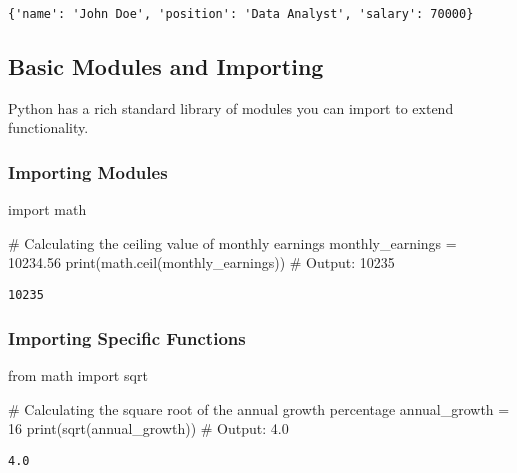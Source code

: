\documentclass[
  letterpaper,
  DIV=11,
  numbers=noendperiod]{scrreprt}
\newenvironment{Shaded}{\begin{snugshade}}{\end{snugshade}}
\newcommand{\BuiltInTok}[1]{\textcolor[rgb]{0.00,0.23,0.31}{#1}}
\newcommand{\CommentTok}[1]{\textcolor[rgb]{0.37,0.37,0.37}{#1}}
\newcommand{\DecValTok}[1]{\textcolor[rgb]{0.68,0.00,0.00}{#1}}
\newcommand{\FloatTok}[1]{\textcolor[rgb]{0.68,0.00,0.00}{#1}}
\newcommand{\ImportTok}[1]{\textcolor[rgb]{0.00,0.46,0.62}{#1}}
\newcommand{\NormalTok}[1]{\textcolor[rgb]{0.00,0.23,0.31}{#1}}
\newcommand{\OperatorTok}[1]{\textcolor[rgb]{0.37,0.37,0.37}{#1}}
\begin{document}
\begin{verbatim}
{'name': 'John Doe', 'position': 'Data Analyst', 'salary': 70000}
\end{verbatim}

\subsection{Basic Modules and
Importing}\label{basic-modules-and-importing}

Python has a rich standard library of modules you can import to extend
functionality.

\subsubsection{Importing Modules}\label{importing-modules}

\begin{Shaded}
\begin{Highlighting}[]
\ImportTok{import}\NormalTok{ math}

\CommentTok{\# Calculating the ceiling value of monthly earnings}
\NormalTok{monthly\_earnings }\OperatorTok{=} \FloatTok{10234.56}
\BuiltInTok{print}\NormalTok{(math.ceil(monthly\_earnings))  }\CommentTok{\# Output: 10235}
\end{Highlighting}
\end{Shaded}

\begin{verbatim}
10235
\end{verbatim}

\subsubsection{Importing Specific
Functions}\label{importing-specific-functions}

\begin{Shaded}
\begin{Highlighting}[]
\ImportTok{from}\NormalTok{ math }\ImportTok{import}\NormalTok{ sqrt}

\CommentTok{\# Calculating the square root of the annual growth percentage}
\NormalTok{annual\_growth }\OperatorTok{=} \DecValTok{16}
\BuiltInTok{print}\NormalTok{(sqrt(annual\_growth))  }\CommentTok{\# Output: 4.0}
\end{Highlighting}
\end{Shaded}

\begin{verbatim}
4.0
\end{verbatim}
\end{document}
